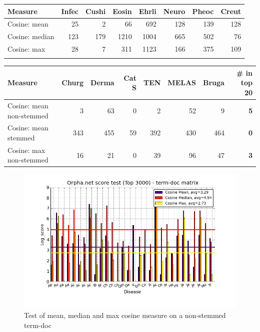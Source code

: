 \begin{table}[H]
  \begin{tiny}
    \label{Table1}
  \begin{tabular}{|l|r|r|r|r|r|r|r|}
    \hline
    Measure &Infec&Cushi&Eosin&Ehrli&Neuro&Pheoc&Creut \\
    \hline
    Cosine: mean & 25 & 2 & 66 & 692 & 128 & 139 & 128 \\
    \hline
    Cosine: median & 123 & 179 & 1210 & 1004 & 665 & 502 & 76 \\
    \hline
    Cosine: max & 28 & 7 & 311 & 1123 & 166 & 375 & 109  \\
    \hline
  \multicolumn{8}{c}{} \\
  \end{tabular}
  \begin{tabular}{|l|r|r|r|r|r|r|r|}
    \hline
    Measure &Churg&Derma&Cat S&TEN&MELAS&Bruga& \scriptsize{\textbf{\# in top 20}} \\
    \hline
    Cosine: mean non-stemmed & 3 & 63 & 0 & 2 & 52 & 9 & \scriptsize{\textbf{5}} \\
    \hline
    Cosine: mean stemmed & 343 & 455 & 59 & 392 & 430 & 464 &  \scriptsize{\textbf{0}}\\
    \hline
    Cosine: max non-stemmed & 16 & 21 & 0 & 39 & 96 & 47 & \scriptsize{\textbf{3}} \\
    \hline
  \end{tabular}
  \end{tiny}
\end{table}

\begin{figure}[H]
  \caption{Test of mean, median and max cosine measure on a non-stemmed term-doc}
  \begin{center}
    \includegraphics[width=1.2\textwidth]{barcharts/termDoc_orphan_hist_3000_ns_mea_med_max_nc.png}
  \end{center}
  \label{termDoc_orphan_hist_3000_ns_mea_med_max_nc}
\end{figure}

